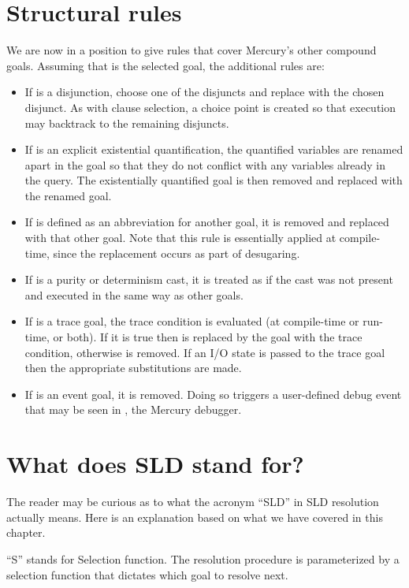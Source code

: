 \section{Structural rules}
\label{sec:structure}

We are now in a position to give rules
that cover Mercury's other compound goals.
Assuming that  is the selected goal,
the additional rules are:

\begin{itemize}
\item
If  is a disjunction,
choose one of the disjuncts
and replace  with the chosen disjunct.
As with clause selection,
a choice point is created so that
execution may backtrack to the remaining disjuncts.
\item
If  is an explicit existential quantification,
the quantified variables are renamed apart in the goal
so that they do not conflict with any variables already in the query.
The existentially quantified goal is then removed
and replaced with the renamed goal.
\item
If  is defined as an abbreviation for another goal,
it is removed and replaced with that other goal.
Note that this rule is essentially applied at compile-time,
since the replacement occurs as part of desugaring.
\item
If  is a purity or determinism cast,
it is treated as if the cast was not present
and executed in the same way as other goals.
\item
If  is a trace goal,
the trace condition is evaluated
(at compile-time or run-time, or both).
If it is true then  is replaced
by the goal with the trace condition,
otherwise  is removed.
If an I/O state is passed to the trace goal
then the appropriate substitutions are made.
\item
If  is an event goal,
it is removed.
Doing so triggers a user-defined debug event
that may be seen in ,
the Mercury debugger.
\end{itemize}


\section{What does SLD stand for?}
\label{sec:sld}

The reader may be curious as to what the acronym ``SLD''
in SLD resolution actually means.
Here is an explanation
based on what we have covered in this chapter.

``S'' stands for Selection function.
The resolution procedure is parameterized by
a selection function that dictates which goal to resolve next.


